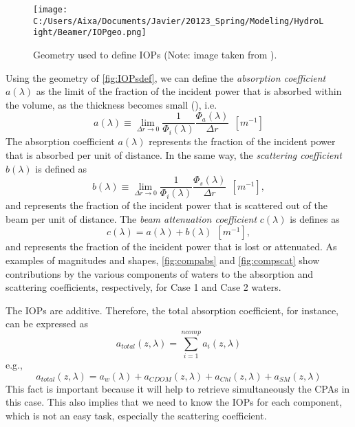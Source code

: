 \begin{figure}[htb]
\centering
\texttt{[image: C:/Users/Aixa/Documents/Javier/20123\_Spring/Modeling/HydroLight/Beamer/IOPgeo.png]}
\caption{Geometry used to define IOPs (Note: image taken from \cite{Mobley:2001}). \label{fig:IOPsdef} } 
\end{figure}

Using the geometry of \autoref{fig:IOPsdef}, we can define the {\it absorption coefficient}  $a(\lambda)$ as the limit of the fraction of the incident power that is absorbed within the volume, as the thickness becomes small (\cite{Mobley:2001}), i.e.
\begin{equation}
  a(\lambda)\equiv \lim_{\Delta r\to 0} \frac{1}{\Phi_i(\lambda)}\frac{\Phi_a(\lambda)}{\Delta r}~~\left[m^{-1} \right]
\end{equation}
The absorption coefficient $a(\lambda)$ represents the fraction of the incident power that is absorbed per unit of distance. In the same way, the {\it scattering coefficient}  $b(\lambda)$ is defined as
\begin{equation}
  b(\lambda)\equiv \lim_{\Delta r\to 0} \frac{1}{\Phi_i(\lambda)}\frac{\Phi_s(\lambda)}{\Delta r}~~\left[m^{-1} \right],
\end{equation}
and represents the fraction of the incident power that is scattered out of the beam per unit of distance. The {\it beam attenuation coefficient}  $c(\lambda)$ is defines as
\begin{equation}
  c(\lambda)=a(\lambda)+b(\lambda)~~\left[m^{-1} \right],
\end{equation}
and represents the fraction of the incident power that is lost or attenuated. As examples of magnitudes and shapes, \autoref{fig:compabs} and \autoref{fig:compscat} show contributions by the various components of waters to the absorption and scattering coefficients, respectively, for Case 1 and Case 2 waters.

The IOPs are additive. Therefore, the total absorption coefficient, for instance, can be expressed as
\begin{equation}
  a_{total}(z,\lambda) = \sum_{i=1}^{ncomp} a_i(z,\lambda)
\end{equation}
e.g.,
\begin{equation}\label{eq:atotal}
  a_{total}(z,\lambda) =  a_w(\lambda) +a_{CDOM}(z,\lambda)+ a_{Chl}(z,\lambda)+a_{SM}(z,\lambda)
\end{equation}
This fact is important because it will help to retrieve simultaneously the CPAs in this case. This also implies that we need to know the IOPs for each component, which is not an easy task, especially the scattering coefficient.

